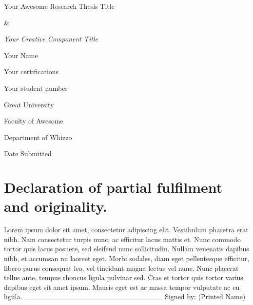 \documentclass[a4paper]{memoir}
\begin{document}
\frontmatter

\vspace*{2.5cm}
\begin{center}
    \huge{Your Awesome Research Thesis Title}

    \huge{\&}

    \emph{\huge{Your Creative Component Title}}


\vspace{2.5cm}
    \Large{Your Name}

    \normalsize{Your certifications}

    Your student number

\vspace{2cm}
    \Large{Great University}

    \normalsize{Faculty of Awesome}

    Department of Whizzo

    Date Submitted


\end{center}


\pagebreak

\tableofcontents

\pagebreak

\mainmatter


\chapter*{Declaration of partial fulfilment and originality.}

\label{declarationofpartialfulfillmentandoriginality.}

Lorem ipsum dolor sit amet, consectetur adipiscing elit. Vestibulum pharetra erat nibh. Nam consectetur turpis nunc, ac efficitur lacus mattis et. Nunc commodo tortor quis lacus posuere, sed eleifend nunc sollicitudin. Nullam venenatis dapibus nibh, et accumsan mi laoreet eget. Morbi sodales, diam eget pellentesque efficitur, libero purus consequat leo, vel tincidunt magna lectus vel nunc. Nunc placerat tellus ante, tempus rhoncus ligula pulvinar sed. Cras et tortor quis tortor varius dapibus eget sit amet ipsum. Mauris eget est ac massa tempor vulputate ac eu ligula. 
\vspace{3cm}
\_\_\_\_\_\_\_\_\_\_\_\_\_\_\_\_\_\_\_\_\_\_\_\_\_\_\_
Signed by: (Printed Name)
\end{document}
